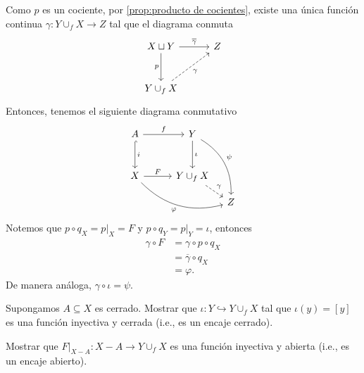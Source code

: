 \begin{ejemplo}
    Como $p$ es un cociente, por \ref{prop:producto de cocientes}, existe una única función continua $\gamma:Y\cup_f X\to Z$ tal que el diagrama conmuta
    \begin{equation*}
    \begin{tikzcd}[column sep=1cm, row sep=1cm]
        X\sqcup Y \arrow[r,"\overline{\gamma}"]  \arrow[d,"p"']& Z\\
        Y\cup_f X\arrow[ur,"\gamma"', dashed]
    \end{tikzcd}
    \end{equation*}
    Entonces, tenemos el siguiente diagrama conmutativo
     \begin{equation*}
        \begin{tikzcd}[column sep=1cm, row sep=1cm]
            A\arrow["f",r]\arrow[d,"i",hook] & Y\arrow["\iota",d]\arrow[ddr,"\psi", bend left]\\
            X\arrow[drr,"\varphi"', bend right] \arrow["F",r]  & Y\cup_f X\arrow[dr,dashed,"\gamma"]\\[-0.65cm]
            & &[-0.65cm] Z
        \end{tikzcd}
    \end{equation*}
    Notemos que $p\circ q_X=p|_X=F$ y $p\circ q_Y=p|_Y=\iota$, entonces
    \begin{align*}
        \gamma \circ F&=\gamma\circ p\circ q_X\\
        &=\overline{\gamma}\circ q_X\\
        &=\varphi.
    \end{align*}
    De manera análoga, $\gamma\circ\iota=\psi.$
    \end{ejemplo}
    \begin{ejercicio}
        Supongamos $A\subseteq X$ es cerrado. Mostrar que $\iota: Y\hookrightarrow Y\cup_f X$ tal que $\iota(y)=[y]$ es una función inyectiva y cerrada (i.e., es un encaje cerrado).
    \end{ejercicio}
    \begin{ejercicio}
        Mostrar que $F|_{X-A}:X-A\to Y\cup_f X$ es una función inyectiva y abierta (i.e., es un encaje abierto).
    \end{ejercicio}
